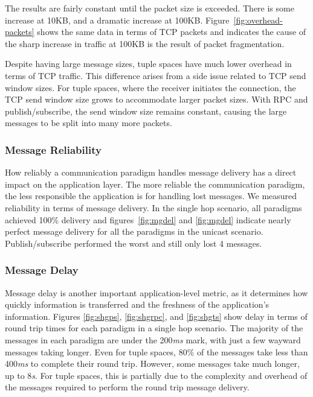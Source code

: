 \documentclass[lnicst]{svmultln}
\begin{document}
The results are fairly constant until the packet size is exceeded. There is some increase at 10KB, and a dramatic increase at 100KB. Figure~\ref{fig:overhead-packets} shows the same data in terms of TCP packets and indicates the cause of the sharp increase in traffic at 100KB is the result of packet fragmentation.

Despite having large message sizes, tuple spaces have much lower overhead in terms of TCP traffic. This difference arises from a side issue related to TCP send window sizes. For tuple spaces, where the receiver initiates the connection, the TCP send window size grows to accommodate larger packet sizes. With RPC and publish/subscribe, the send window size remains constant, causing the large messages to be split into many more packets. 

\subsubsection{Message Reliability}

How reliably a communication paradigm handles message delivery has a direct impact on the application layer. The more reliable the communication paradigm, the less responsible the application is for handling lost messages. We measured reliability in terms of message delivery. In the single hop scenario, all paradigms achieved 100\% delivery and figures~\ref{fig:mgdel} and \ref{fig:mgdel} indicate nearly perfect message delivery for all the paradigms in the unicast scenario. Publish/subscribe performed the worst and still only lost 4 messages.

\subsubsection{Message Delay}

Message delay is another important application-level metric, as it determines how quickly information is transferred and the freshness of the application's information. Figures \ref{fig:shgps}, \ref{fig:shgrpc}, and \ref{fig:shgts} show delay in terms of round trip times for each paradigm in a single hop scenario. The majority of the messages in each paradigm are under the 200\textit{ms} mark, with just a few wayward messages taking longer. Even for tuple spaces, 80\% of the messages take less than 400\textit{ms} to complete their round trip. However, some messages take much longer, up to 8\textit{s}. For tuple spaces, this is partially due to the complexity and overhead of the messages required to perform the round trip message delivery.
\end{document}
